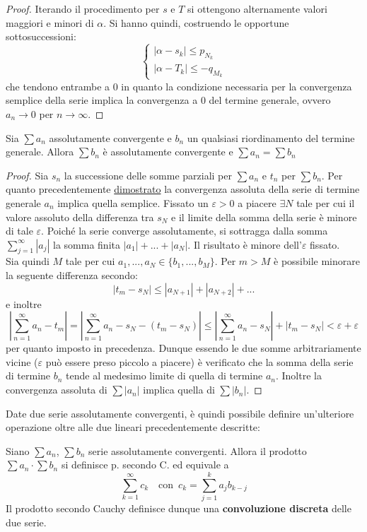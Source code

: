 \documentclass[10pt, oneside]{book}
\theoremstyle{plain}
\begin{document}
\begin{proof}
    Iterando il procedimento per $s$ e $T$ si ottengono alternamente valori maggiori e minori di $\alpha$. Si hanno quindi, costruendo le opportune sottosuccessioni:
    \[\begin{cases}
        |\alpha - s_k| \leq p_{N_k}\\
        |\alpha - T_k| \leq -q_{M_k}
    \end{cases}\]
    che tendono entrambe a 0 in quanto la condizione necessaria per la convergenza semplice della serie implica la convergenza a 0 del termine generale, ovvero $a_n \rightarrow 0$ per $n \rightarrow \infty$.
\end{proof}

\begin{ther}
    Sia $\sum a_n$ assolutamente convergente e $b_n$ un qualsiasi riordinamento del termine generale. Allora $\sum b_n$ è assolutamente convergente e $\sum a_n = \sum b_n$
\end{ther}
\begin{proof}
    Sia $s_n$ la successione delle somme parziali per $\sum a_n$ e $t_n$ per $\sum b_n$. Per quanto precedentemente \hyperlink{assolutamente}{dimostrato} la convergenza assoluta della serie di termine generale $a_n$ implica quella semplice. Fissato un $\varepsilon > 0$ a piacere $\exists N$ tale per cui il valore assoluto della differenza tra $s_N$ e il limite della somma della serie è minore di tale $\varepsilon$. Poiché la serie converge assolutamente, si sottragga dalla somma $\sum_{j=1}^\infty |a_j|$ la somma finita $|a_1| + ... + |a_N|$. Il risultato è minore dell'$\varepsilon$ fissato.
    \\Sia quindi $M$ tale per cui $a_1, ..., a_N \in \{b_1, ..., b_M\}$. Per $m > M$ è possibile minorare la seguente differenza secondo:
    \[|t_m - s_N| \leq |a_{N+1}| + |a_{N+2}| + ...\]
    e inoltre
    \[|\sum \limits_{n=1}^{\infty}a_n - t_m| = |\sum \limits_{n=1}^{\infty}a_n - s_N - (t_m - s_N)| \leq |\sum \limits_{n=1}^{\infty}a_n - s_N| + |t_m - s_N| < \varepsilon + \varepsilon\]
    per quanto imposto in precedenza. Dunque essendo le due somme arbitrariamente vicine ($\varepsilon$ può essere preso piccolo a piacere) è verificato che la somma della serie di termine $b_n$ tende al medesimo limite di quella di termine $a_n$. Inoltre la convergenza assoluta di $\sum |a_n|$ implica quella di $\sum |b_n|$.
\end{proof}

Date due serie assolutamente convergenti, è quindi possibile definire un'ulteriore operazione oltre alle due lineari precedentemente descritte:
\begin{defin}
Siano $\sum a_n$, $\sum b_n$ serie assolutamente convergenti. Allora il prodotto $\sum a_n \cdot \sum b_n$ si definisce p. secondo C. ed equivale a 
\[\sum\limits_{k=1}^{\infty} c_k \quad \textrm{con} \enspace c_k = \sum\limits_{j=1}^{k} a_j b_{k - j}\]
Il prodotto secondo Cauchy definisce dunque una \textbf{convoluzione discreta} delle due serie.
\end{defin}
\end{document}

